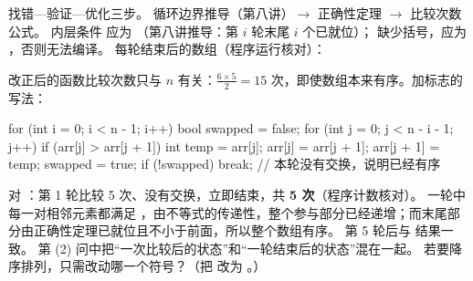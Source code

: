  找错—验证—优化三步。
 循环边界推导（第八讲）$\to$ 正确性定理 $\to$ 比较次数公式。
  内层条件  应为 （第八讲推导：第 $i$ 轮末尾 $i$ 个已就位）；  缺少括号，应为 ，否则无法编译。
 每轮结束后的数组（程序运行核对）：
\begin{center}\end{center}
 改正后的函数比较次数只与 $n$ 有关：$\frac{6\times5}{2}=15$ 次，即使数组本来有序。加标志的写法：
\begin{code}
for (int i = 0; i < n - 1; i++)
{
    bool swapped = false;
    for (int j = 0; j < n - i - 1; j++)
        if (arr[j] > arr[j + 1])
        { int temp = arr[j]; arr[j] = arr[j + 1]; arr[j + 1] = temp; swapped = true; }
    if (!swapped) break;        // 本轮没有交换，说明已经有序
}
\end{code}
对 ：第 1 轮比较 5 次、没有交换，立即结束，共 \textbf{5 次}（程序计数核对）。
 一轮中每一对相邻元素都满足 ，由不等式的传递性，整个参与部分已经递增；而末尾部分由正确性定理已就位且不小于前面，所以整个数组有序。
 第 5 轮后与  结果一致。
 第 (2) 问中把“一次比较后的状态”和“一轮结束后的状态”混在一起。
 若要降序排列，只需改动哪一个符号？（把 \cc{>} 改为 \cc{<}。）

